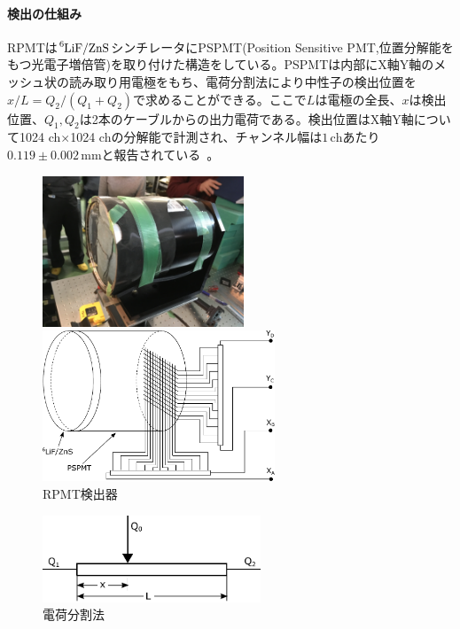 \paragraph{検出の仕組み}
RPMTは$\ce{^6LiF}/\ce{ZnS}$シンチレータにPSPMT(Position Sensitive PMT,位置分解能をもつ光電子増倍管)を取り付けた構造をしている。PSPMTは内部にX軸Y軸のメッシュ状の読み取り用電極をもち、電荷分割法により中性子の検出位置を$x/L=Q_2/(Q_1+Q_2)$で求めることができる。ここで$L$は電極の全長、$x$は検出位置、$Q_1,Q_2$は2本のケーブルからの出力電荷である。検出位置はX軸Y軸について1024 ch$\times$1024 chの分解能で計測され、チャンネル幅は$1 \, \mathrm{ch}$あたり$0.119\pm0.002 \, \mathrm{mm}$と報告されている~\cite{KUANS_yamashita}。

\begin{figure}[h]
\begin{minipage}{0.5\hsize}
\begin{center}
\includegraphics[height=4.5cm]{detector/detector_photo2.jpg}
\end{center}
\end{minipage}
\begin{minipage}{0.5\hsize}
\begin{center}
\includegraphics[height=4.5cm]{detector/detector_fig2.pdf}
\end{center}
\end{minipage}
\caption{RPMT検出器}
\end{figure}
\begin{figure}[h]
\begin{minipage}{0.5\hsize}
\begin{center}
\includegraphics[width=6.5cm]{detector/detector_fig3.pdf}
\caption{電荷分割法}
\end{center}
\end{minipage}
\end{figure}





